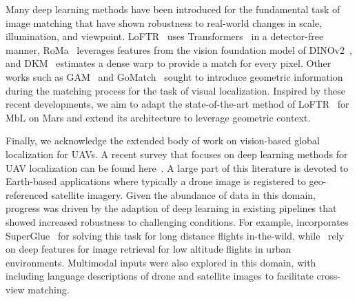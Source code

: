 Many deep learning methods have been introduced for the fundamental task of image matching that have shown robustness to real-world changes in scale, illumination, and viewpoint. LoFTR~\cite{loftr} uses Transformers~\cite{transformer} in a detector-free manner, RoMa~\cite{roma} leverages features from the vision foundation model of DINOv2~\cite{dinov2}, and DKM~\cite{edstedt2023dkm} estimates a dense warp to provide a match for every pixel. Other works such as GAM~\cite{yu2022improving} and GoMatch~\cite{zhou2022geometry} sought to introduce geometric information during the matching process for the task of visual localization. Inspired by these recent developments, we aim to adapt the state-of-the-art method of LoFTR~\cite{loftr} for MbL on Mars and extend its architecture to leverage geometric context.

Finally, we acknowledge the extended
body of work on vision-based global localization for UAVs. A recent survey that focuses on deep learning methods for UAV localization can be found here~\cite{couturier2024review, Xu2018VisionbasedUA}. A large part of this literature is devoted to Earth-based applications where typically a drone image is registered to geo-referenced satellite imagery. Given the abundance of data in this domain, progress was driven by the adaption of deep learning in existing pipelines that showed increased robustness to challenging conditions. For example, \cite{gurgu2022vision} incorporates SuperGlue~\cite{sarlin2020superglue} for solving this task for long distance flights in-the-wild, while~\cite{dai2023vision,he2024leveraging} rely on deep features for image retrieval for low altitude flights in urban environments. Multimodal inputs were also explored in this domain, with~\cite{zhu2023uav} including language descriptions of drone and satellite images to facilitate cross-view matching. 

